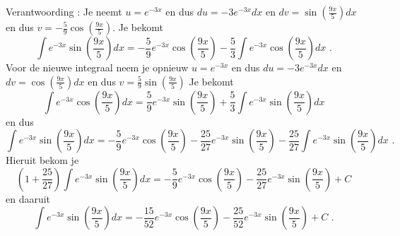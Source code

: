 \documentclass{article}
\begin{document}
Verantwoording : Je neemt $u=e^{-3x}$ en dus $du=-3e^{-3x}dx$ en $dv=\sin \left( \frac{9x}{5}  \right)dx$ en dus $v=-\frac{5}{9} \cos \left( \frac{9x}{5}  \right)$.
Je bekomt
\[
\int e^{-3x}\sin \left( \frac{9x}{5}  \right)dx=-\frac{5}{9} e^{-3x}\cos \left(  \frac{9x}{5} \right)-\frac{5}{3} \int e^{-3x}\cos \left( \frac{9x}{5}  \right)dx \text { .}
\]
Voor de nieuwe integraal neem je opnieuw $u=e^{-3x}$ en dus $du=-3e^{-3x}dx$ en $dv=\cos \left( \frac{9x}{5}  \right)dx$ en dus $v=\frac{5}{9} \sin \left(  \frac{9x}{5} \right)$
Je bekomt
\[
\int e^{-3x}\cos \left( \frac{9x}{5}  \right)dx=\frac{5}{9}e^{-3x}\sin \left( \frac{9x}{5}  \right)+\frac{5}{3} \int e^{-3x}\sin \left( \frac{9x}{5}  \right)dx
\]
en dus
\[
\int e^{-3x}\sin \left( \frac{9x}{5}  \right)dx=-\frac{5}{9} e^{-3x}\cos \left(  \frac{9x}{5} \right)-\frac{25}{27}e^{-3x}\sin \left( \frac{9x}{5}  \right)-\frac{25}{27} \int e^{-3x}\sin \left( \frac{9x}{5}  \right)dx \text { .}
\]
Hieruit bekom je
\[
\left(1+\frac{25}{27}\right)\int e^{-3x}\sin \left( \frac{9x}{5}  \right)dx=-\frac{5}{9} e^{-3x}\cos \left(  \frac{9x}{5} \right)-\frac{25}{27}e^{-3x}\sin \left( \frac{9x}{5}  \right)+C
\]
en daaruit
\[
\int e^{-3x}\sin \left( \frac{9x}{5}  \right)dx=-\frac{15}{52} e^{-3x}\cos \left(  \frac{9x}{5} \right)-\frac{25}{52}e^{-3x}\sin \left( \frac{9x}{5}  \right)+C \text { .}
\]
\end{document}
